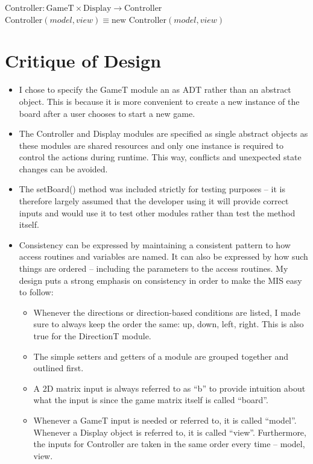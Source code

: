 \documentclass[12pt]{article}
\begin{document}
\noindent
\noindent $\mbox{Controller}: \text{GameT} \times \text{Display} \rightarrow \text{Controller}$\\
\noindent 
$\mbox{Controller}(model,view) \equiv \text{new Controller}(model,view)$\\

\newpage

\section*{Critique of Design}

\begin{itemize}
    \item I chose to specify the GameT module an as ADT rather than an abstract object. This is because it is more convenient to create a new instance of the board after a user chooses to start a new game.
    \item The Controller and Display modules are specified as single abstract objects as these modules are shared resources and only one instance is required to control the actions during runtime. This way, conflicts and unexpected state changes can be avoided.
    \item The setBoard() method was included strictly for testing purposes – it is therefore largely assumed that the developer using it will provide correct inputs and would use it to test other modules rather than test the method itself.
    \item Consistency can be expressed by maintaining a consistent pattern to how access routines and variables are named. It can also be expressed by how such things are ordered – including the parameters to the access routines. My design puts a strong emphasis on consistency in order to make the MIS easy to follow:
    \begin{itemize}
        \item Whenever the directions or direction-based conditions are listed, I made sure to always keep the order the same: up, down, left, right. This is also true for the DirectionT module.
        \item The simple setters and getters of a module are grouped together and outlined first.
        \item A 2D matrix input is always referred to as “b” to provide intuition about what the input is since the game matrix itself is called “board”.
        \item Whenever a GameT input is needed or referred to, it is called “model”. Whenever a Display object is referred to, it is called “view”. Furthermore, the inputs for Controller are taken in the same order every time – model, view.

\end{itemize}
\end{itemize}
\end{document}
